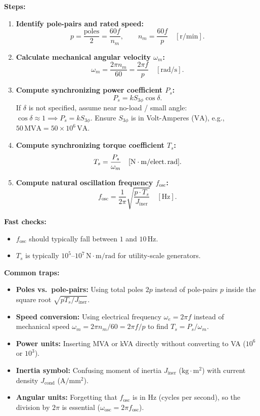 \textbf{Steps:}
\begin{enumerate}
  \item \textbf{Identify pole-pairs and rated speed:}
  \[
  p = \frac{\text{poles}}{2} = \frac{60 f}{n_m}, \qquad n_m = \frac{60 f}{p} \quad [\mathrm{r/min}].
  \]
  \item \textbf{Calculate mechanical angular velocity $\omega_m$:}
  \[
  \omega_m = \frac{2\pi n_m}{60} = \frac{2\pi f}{p} \quad [\mathrm{rad/s}].
  \]
  \item \textbf{Compute synchronizing power coefficient $P_s$:}
  \[
  P_s = k S_{3\phi}\cos\delta.
  \]
  If $\delta$ is not specified, assume near no-load / small angle: $\cos\delta \approx 1 \implies P_s = k S_{3\phi}$.
  Ensure $S_{3\phi}$ is in Volt-Amperes ($\mathrm{VA}$), e.g., $50\,\mathrm{MVA} = 50\times 10^6\,\mathrm{VA}$.
  \item \textbf{Compute synchronizing torque coefficient $T_s$:}
  \[
  T_s = \frac{P_s}{\omega_m} \quad [\mathrm{N\cdot m/\text{elect.\,rad}}].
  \]
  \item \textbf{Compute natural oscillation frequency $f_{\mathrm{osc}}$:}
  \[
  f_{\mathrm{osc}} = \frac{1}{2\pi}\sqrt{\frac{p\cdot T_s}{J_{\mathrm{iner}}}} \quad [\mathrm{Hz}].
  \]
\end{enumerate}

\textbf{Fast checks:}
\begin{itemize}
  \item $f_{\mathrm{osc}}$ should typically fall between $1$ and $10\,\mathrm{Hz}$.
  \item $T_s$ is typically $10^5\text{--}10^7\,\mathrm{N\cdot m/rad}$ for utility-scale generators.
\end{itemize}

\textbf{Common traps:}
\begin{itemize}
  \item \textbf{Poles vs.\ pole-pairs:} Using total poles $2p$ instead of pole-pairs $p$ inside the square root $\sqrt{p T_s / J_{\mathrm{iner}}}$.
  \item \textbf{Speed conversion:} Using electrical frequency $\omega_e = 2\pi f$ instead of mechanical speed $\omega_m = 2\pi n_m / 60 = 2\pi f / p$ to find $T_s = P_s / \omega_m$.
  \item \textbf{Power units:} Inserting MVA or kVA directly without converting to VA ($10^6$ or $10^3$).
  \item \textbf{Inertia symbol:} Confusing moment of inertia $J_{\mathrm{iner}}$ ($\mathrm{kg\cdot m^2}$) with current density $J_{\mathrm{cond}}$ ($\mathrm{A/mm^2}$).
  \item \textbf{Angular units:} Forgetting that $f_{\mathrm{osc}}$ is in Hz (cycles per second), so the division by $2\pi$ is essential ($\omega_{\mathrm{osc}} = 2\pi f_{\mathrm{osc}}$).
\end{itemize}
